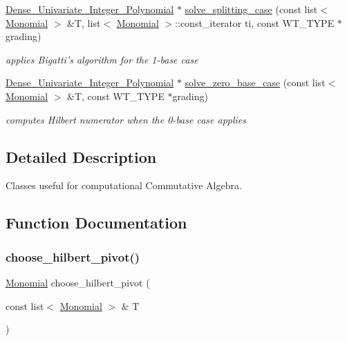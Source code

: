 \begin{DoxyCompactItemize}
\hyperlink{group__polygroup_class_dense___univariate___integer___polynomial}{Dense\+\_\+\+Univariate\+\_\+\+Integer\+\_\+\+Polynomial} $\ast$ \hyperlink{group__commalg_gaf0830e37f5adaa15eb30b562acf31076}{solve\+\_\+splitting\+\_\+case} (const list$<$ \hyperlink{group__polygroup_class_monomial}{Monomial} $>$ \&T, list$<$ \hyperlink{group__polygroup_class_monomial}{Monomial} $>$\+::const\+\_\+iterator ti, const W\+T\+\_\+\+T\+Y\+PE $\ast$grading)
\begin{DoxyCompactList}\small\item\em applies Bigatti's algorithm for the 1-\/base case \end{DoxyCompactList}\item 
\hyperlink{group__polygroup_class_dense___univariate___integer___polynomial}{Dense\+\_\+\+Univariate\+\_\+\+Integer\+\_\+\+Polynomial} $\ast$ \hyperlink{group__commalg_gab4cfb96e87e5dd698f56498bb6ba5472}{solve\+\_\+zero\+\_\+base\+\_\+case} (const list$<$ \hyperlink{group__polygroup_class_monomial}{Monomial} $>$ \&T, const W\+T\+\_\+\+T\+Y\+PE $\ast$grading)
\begin{DoxyCompactList}\small\item\em computes Hilbert numerator when the 0-\/base case applies \cite{Bigatti97} \end{DoxyCompactList}\end{DoxyCompactItemize}


\subsection{Detailed Description}
Classes useful for computational Commutative Algebra. 



\subsection{Function Documentation}
\mbox{\label{group__commalg_ga052ae2e711aaf6d332a8aed218ce9ef9}} 
\subsubsection{\texorpdfstring{choose\+\_\+hilbert\+\_\+pivot()}{choose\_hilbert\_pivot()}}
{\footnotesize\ttfamily \hyperlink{group__polygroup_class_monomial}{Monomial} choose\+\_\+hilbert\+\_\+pivot (\begin{DoxyParamCaption}\item[{const list$<$ \hyperlink{group__polygroup_class_monomial}{Monomial} $>$ \&}]{T }\end{DoxyParamCaption})}



